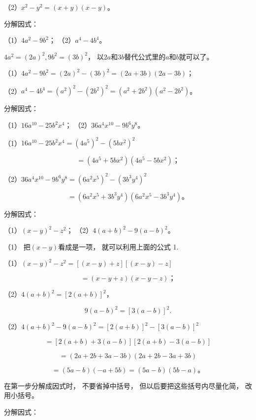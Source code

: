 （2）\(x^{2} - y^{2} = (x + y)(x - y)\)。

 分解因式：

（1）\(4a^{2} - 9b^{2}\)； （2）\(a^4 - 4b^4\)。

\(4a^{2} = (2a)^{2}, 9b^{2} = (3b)^{2}\)，
以\(2a\)和\(3b\)替代公式里的\(a\)和\(b\)就可以了。

（1）\(4a^{2} - 9b^{2} = (2a)^{2} - (3b)^{2} = (2a + 3b)(2a - 3b)\)；

（2）\(a^4 - 4b^4 = (a^2)^2 - (2b^2)^2 = (a^2 + 2b^2)(a^2 - 2b^2)\)。

 分解因式：

（1）\(16a^{10} - 25b^{2}x^{4}\)；
（2）\(36a^{4}x^{10} - 9b^{6}y^{8}\)。

（1）\(16a^{10} - 25b^{2}x^{4} = (4a^{5})^{2} - (5bx^{2})^{2}\)

\[
= (4 a ^{5} + 5 b x ^{2}) (4 a ^{5} - 5 b x ^{2})\text{；}
\]

（2）\(36a^{4}x^{10} - 9b^{6}y^{8} = (6a^{2}x^{5})^{2} - (3b^{3}y^{4})^{2}\)

\[
= (6 a ^{2} x ^{5} + 3 b ^{3} y ^{4}) (6 a ^{2} x ^{5} - 3 b ^{3} y ^{4})\text{。}
\]

 分解因式：

（1）\((x - y)^2 - z^2\)； （2）\(4(a + b)^2 - 9(a - b)^2\)。

 （1） 把\((x - y)\)看成是一项， 就可以利用上面的公式
1.

 （1）\((x - y)^2 - z^2 = [(x - y) + z][(x - y) - z]\)

\[
= (x - y + z) (x - y - z)\text{；}
\]

 （2）\(4(a + b)^{2} = [2(a + b)]^{2}\)，

\[
9 (a - b) ^{2} = [ 3 (a - b) ] ^{2}.
\]

（2）\(4(a + b)^{2} - 9(a - b)^{2} = [2(a + b)]^{2} - [3(a - b)]^{2}\)

\[
= [ 2 (a + b) + 3 (a - b) ] [ 2 (a + b) - 3 (a - b) ]
\]

\[
= (2 a + 2 b + 3 a - 3 b) (2 a + 2 b - 3 a + 3 b)
\]

\[
= (5 a - b) (- a + 5 b) = (5 a - b) (5 b - a)\text{。}
\]

 在第一步分解成因式时， 不要省掉中括号，
但以后要把这些括号内尽量化简， 改用小括号。

分解因式：

